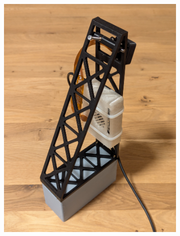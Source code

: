 \begin{figure}[H]
\centering
\begin{subfigure}{0.4\textwidth}
\includegraphics[width=0.95\linewidth]{assets/informatik-prototyp/camer_tower_1.png} 
\end{subfigure}
\begin{subfigure}{0.4\textwidth}

\end{subfigure}
\end{figure}
